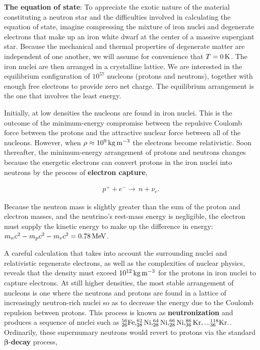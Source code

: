 \documentclass[a4paper,10pt]{article}
\begin{document}
{\noindent}\textbf{The equation of state}: To appreciate the exotic nature of the material constituting a neutron star and the difficulties involved in calculating the equation of state, imagine compressing the mixture of iron nuclei and degenerate electrons that make up an iron white dwarf at the center of a massive supergiant star. Because the mechanical and thermal properties of degenerate matter are independent of one another, we will assume for convenience that $T=0\,{\rm K}$. The iron nuclei are then arranged in a crystalline lattice. We are interested in the equilibrium configuration of $10^{57}$ nucleons (protons and neutrons), together with enough free electrons to provide zero net charge. The equilibrium arrangement is the one that involves the least energy.

{\noindent}Initially, at low densities the nucleons are found in iron nuclei. This is the outcome of the minimum-energy compromise between the repulsive Coulomb force between the protons and the attractive nuclear force between all of the nucleons. However, when $\rho\approx10^9\,{\rm kg\,m^{-3}}$ the electrons become relativistic. Soon thereafter, the minimum-energy arrangement of protons and neutrons changes because the energetic electrons can convert protons in the iron nuclei into neutrons by the process of \textbf{electron capture},

\begin{align*}
    p^+ +e^- \rightarrow\,n + \nu_e.
\end{align*}

{\noindent}Because the neutron mass is slightly greater than the sum of the proton and electron masses, and the neutrino's rest-mass energy is negligible, the electron must supply the kinetic energy to make up the difference in energy: $m_nc^2 - m_pc^2 - m_ec^2 = 0.78\,{\rm MeV}$.

{\noindent}A careful calculation that takes into account the surrounding nuclei and relativistic regenerate electrons, as well as the complexities of nuclear physics, reveals that the density must exceed $10^{12}\,{\rm kg\,m^{-3}}$ for the protons in iron nuclei to capture electrons. At still higher densities, the most stable arrangement of nucleons is one where the neutrons and protons are found in a lattice of increasingly neutron-rich nuclei so as to decrease the energy due to the Coulomb repulsion between protons. This process is known as \textbf{neutronization} and produces a sequence of nuclei such as ${\rm ^{56}_{26}Fe, ^{62}_{28}Ni, ^{64}_{28}Ni, ^{66}_{28}Ni, ^{86}_{36}Kr, ... ^{118}_{36}Kr.}$. Ordinarily, these supernumary neutrons would revert to protons via the standard $\mathbf{\beta}$-\textbf{decay} process,
\end{document}
